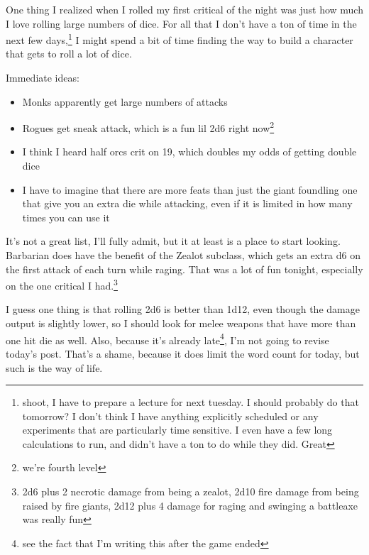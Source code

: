 \documentclass[12pt]{article}[titlepage]
\renewcommand{\,}{\textsuperscript{,}}
\begin{document}
One thing I realized when I rolled my first critical of the night was just how much I love rolling large numbers of dice.
For all that I don't have a ton of time in the next few days,\footnote{shoot, I have to prepare a lecture for next tuesday.
I should probably do that tomorrow? I don't think I have anything explicitly scheduled or any experiments that are particularly time sensitive.
I even have a few long calculations to run, and didn't have a ton to do while they did.
Great} I might spend a bit of time finding the way to build a character that gets to roll a lot of dice.

Immediate ideas:
\begin{itemize}
\item Monks apparently get large numbers of attacks
\item Rogues get sneak attack, which is a fun lil 2d6 right now\footnote{we're fourth level}
\item I think I heard half orcs crit on 19, which doubles my odds of getting double dice
\item I have to imagine that there are more feats than just the giant foundling one that give you an extra die while attacking, even if it is limited in how many times you can use it
\end{itemize}

It's not a great list, I'll fully admit, but it at least is a place to start looking.
Barbarian does have the benefit of the Zealot subclass, which gets an extra d6 on the first attack of each turn while raging.
That was a lot of fun tonight, especially on the one critical I had.\footnote{2d6 plus 2 necrotic damage from being a zealot, 2d10 fire damage from being raised by fire giants, 2d12 plus 4 damage for raging and swinging a battleaxe was really fun}

I guess one thing is that rolling 2d6 is better than 1d12, even though the damage output is slightly lower, so I should look for melee weapons that have more than one hit die as well.
Also, because it's already late\footnote{see the fact that I'm writing this after the game ended}, I'm not going to revise today's post.
That's a shame, because it does limit the word count for today, but such is the way of life.
\end{document}
